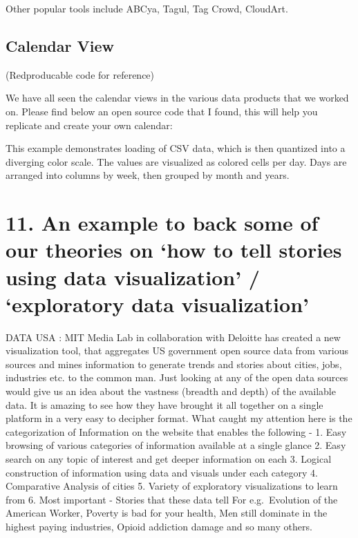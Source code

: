 \documentclass[]{book}
\theoremstyle{definition}
\theoremstyle{definition}
\theoremstyle{definition}
\theoremstyle{remark}
\begin{document}
Other popular tools include ABCya, Tagul, Tag Crowd, CloudArt.

\subsection{Calendar View}\label{calendar-view}

(Redproducable code for reference)

\citep{Calendar_Layout} We have all seen the calendar views in the
various data products that we worked on. Please find below an open
source code that I found, this will help you replicate and create your
own calendar: \citep{CalendarView}

This example demonstrates loading of CSV data, which is then quantized
into a diverging color scale. The values are visualized as colored cells
per day. Days are arranged into columns by week, then grouped by month
and years.

\section{\texorpdfstring{11. An example to back some of our theories on
`how to tell stories using data visualization' / `exploratory data
visualization'}{11. An example to back some of our theories on how to tell stories using data visualization / exploratory data visualization}}\label{an-example-to-back-some-of-our-theories-on-how-to-tell-stories-using-data-visualization-exploratory-data-visualization}

DATA USA : \citep{DataUSA} MIT Media Lab in collaboration with Deloitte
has created a new visualization tool, that aggregates US government open
source data from various sources and mines information to generate
trends and stories about cities, jobs, industries etc. to the common
man. Just looking at any of the open data sources would give us an idea
about the vastness (breadth and depth) of the available data. It is
amazing to see how they have brought it all together on a single
platform in a very easy to decipher format. What caught my attention
here is the categorization of Information on the website that enables
the following - 1. Easy browsing of various categories of information
available at a single glance 2. Easy search on any topic of interest and
get deeper information on each 3. Logical construction of information
using data and visuals under each category 4. Comparative Analysis of
cities 5. Variety of exploratory visualizations to learn from 6. Most
important - Stories that these data tell For e.g.~Evolution of the
American Worker, Poverty is bad for your health, Men still dominate in
the highest paying industries, Opioid addiction damage and so many
others.
\end{document}
